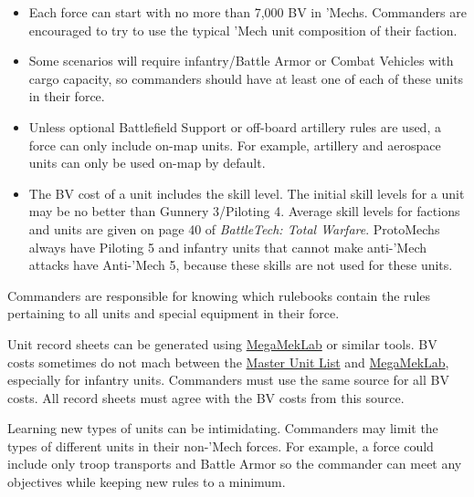 \begin{itemize}
\item Each force can start with no more than 7,000 BV in 'Mechs.
Commanders are encouraged to try to use the typical 'Mech unit composition of their faction.

\item Some scenarios will require infantry/Battle Armor or Combat Vehicles with cargo capacity, so commanders should have at least one of each of these units in their force.

\item Unless optional Battlefield Support or off-board artillery rules are used, a force can only include on-map units.
For example, artillery and aerospace units can only be used on-map by default.

\item The BV cost of a unit includes the skill level.
The initial skill levels for a unit may be no better than Gunnery 3/Piloting 4.
Average skill levels for factions and units are given on page 40 of \emph{BattleTech: Total Warfare}.
ProtoMechs always have Piloting 5 and infantry units that cannot make anti-'Mech attacks have Anti-'Mech 5, because these skills are not used for these units.

\end{itemize}

Commanders are responsible for knowing which rulebooks contain the rules pertaining to all units and special equipment in their force.

Unit record sheets can be generated using \href{https://megamek.org}{MegaMekLab} or similar tools.
BV costs sometimes do not mach between the \href{http://www.masterunitlist.info}{Master Unit List} and \href{https://megamek.org}{MegaMekLab}, especially for infantry units.
Commanders must use the same source for all BV costs.
All record sheets must agree with the BV costs from this source.

Learning new types of units can be intimidating.
Commanders may limit the types of different units in their non-'Mech forces.
For example, a force could include only troop transports and Battle Armor so the commander can meet any objectives while keeping new rules to a minimum.
